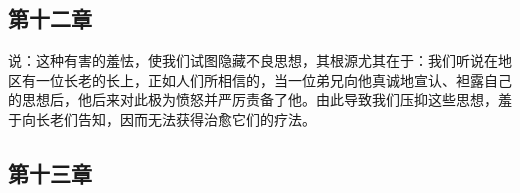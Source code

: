 
\subsection{第十二章}

\par

说：这种有害的羞怯，使我们试图隐藏不良思想，其根源尤其在于：我们听说在地区有一位长老的长上，正如人们所相信的，当一位弟兄向他真诚地宣认、袒露自己的思想后，他后来对此极为愤怒并严厉责备了他。由此导致我们压抑这些思想，羞于向长老们告知，因而无法获得治愈它们的疗法。\par


\subsection{第十三章}

\par


